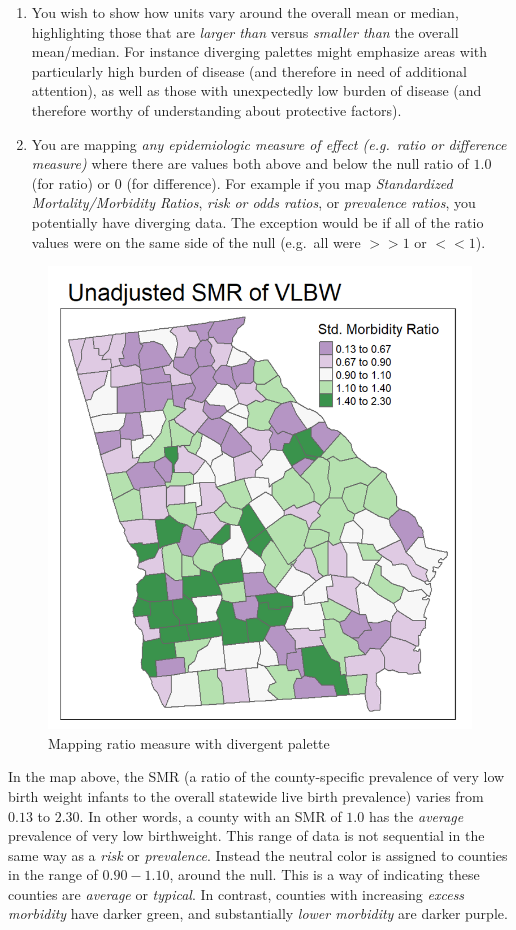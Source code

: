 \documentclass[
]{book}
\providecommand{\tightlist}{%
  \setlength{\itemsep}{0pt}\setlength{\parskip}{0pt}}
\begin{document}
\begin{enumerate}
\def\labelenumi{\arabic{enumi}.}
\tightlist
\item
  You wish to show how units vary around the overall mean or median, highlighting those that are \emph{larger than} versus \emph{smaller than} the overall mean/median. For instance diverging palettes might emphasize areas with particularly high burden of disease (and therefore in need of additional attention), as well as those with unexpectedly low burden of disease (and therefore worthy of understanding about protective factors).
\item
  You are mapping \emph{any epidemiologic measure of effect (e.g.~ratio or difference measure)} where there are values both above and below the null ratio of \(1.0\) (for ratio) or \(0\) (for difference). For example if you map \emph{Standardized Mortality/Morbidity Ratios}, \emph{risk or odds ratios}, or \emph{prevalence ratios}, you potentially have diverging data. The exception would be if all of the ratio values were on the same side of the null (e.g.~all were \(>>1\) or \(<<1\)).
\end{enumerate}

\begin{figure}
\includegraphics[width=0.5\linewidth]{images/diverge-smr} \caption{Mapping ratio measure with divergent palette}\label{fig:unnamed-chunk-5}
\end{figure}

In the map above, the SMR (a ratio of the county-specific prevalence of very low birth weight infants to the overall statewide live birth prevalence) varies from \(0.13\) to \(2.30\). In other words, a county with an SMR of \(1.0\) has the \emph{average} prevalence of very low birthweight. This range of data is not sequential in the same way as a \emph{risk} or \emph{prevalence}. Instead the neutral color is assigned to counties in the range of \(0.90-1.10\), around the null. This is a way of indicating these counties are \emph{average} or \emph{typical}. In contrast, counties with increasing \emph{excess morbidity} have darker green, and substantially \emph{lower morbidity} are darker purple.
\end{document}
